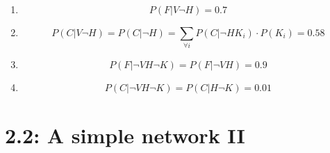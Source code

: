 \documentclass[a4paper,10pt,fleqn]{article}
\begin{document}
\begin{enumerate}[1.]
    \item $$P(F|V\lnot H) = 0.7$$

    \item $$P(C|V\lnot H) = P(C|\lnot H) = \sum_{\forall i} P(C|\lnot HK_i) \cdot P(K_i) = 0.58 	$$

    \item $$P(F|\lnot VH \lnot K) = P(F|\lnot VH) = 0.9	$$

    \item $$P(C|\lnot VH\lnot K) = P(C|H\lnot K) = 0.01	$$

\end{enumerate}

\section*{2.2: A simple network II}
\end{document}
